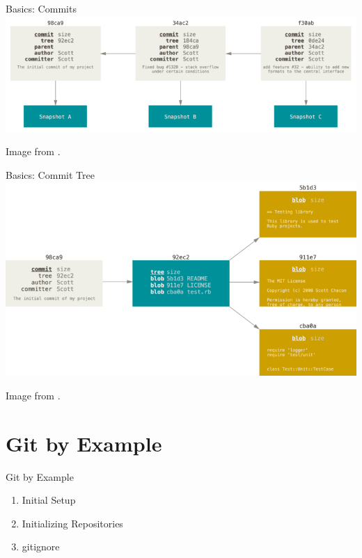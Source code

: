 \documentclass[aspectratio=169,fleqn]{beamer}
\begin{document}
  \begin{frame}{Basics: Commits}
    \centering
    \includegraphics[width=\linewidth]{images/commits-and-parents.png}

    {\scriptsize Image from \textcite{pro-git}.}
  \end{frame}

  \begin{frame}{Basics: Commit Tree}
    \centering
    \includegraphics[height=0.8\textheight]{images/commit-and-tree.png}

    {\scriptsize Image from \textcite{pro-git}.}
  \end{frame}


\section{Git by Example} %
\label{sec:git_by_example}

  \begin{frame}{Git by Example}
    \begin{enumerate}
      \item Initial Setup
      \item Initializing Repositories
      \item gitignore
    \end{enumerate}
  \end{frame}
\end{document}
